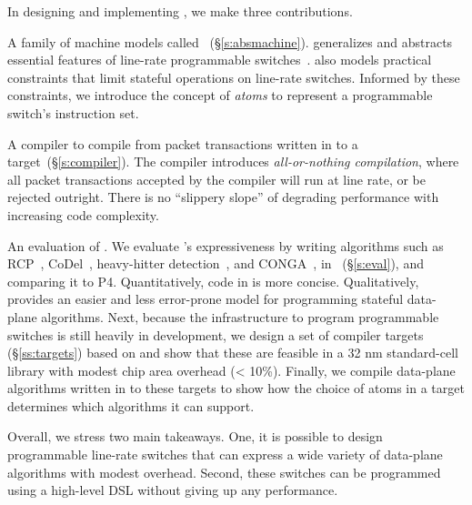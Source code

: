 In designing and implementing \pktlanguage, we make three contributions.
\begin{CompactEnumerate}
\item A family of machine models called \absmachine~(\S\ref{s:absmachine}).
    \absmachine generalizes and abstracts essential features of
line-rate programmable switches~\cite{rmt, xpliant, flexpipe}. \absmachine also
models practical constraints that limit stateful operations on line-rate
switches.  Informed by these constraints, we introduce the concept of {\em
atoms} to represent a programmable switch's instruction set.

\item A compiler to compile from packet transactions written in \pktlanguage
to a \absmachine target~(\S\ref{s:compiler}). The \pktlanguage compiler introduces
\textit{all-or-nothing compilation}, where all packet transactions accepted by
the compiler will run at line rate, or be rejected outright. There is no
``slippery slope'' of degrading performance with increasing code complexity.

\item An evaluation of \pktlanguage. We evaluate \pktlanguage's expressiveness
  by writing algorithms such as RCP~\cite{rcp}, CoDel~\cite{codel},
  heavy-hitter detection~\cite{opensketch}, and CONGA~\cite{conga}, in
  \pktlanguage~(\S\ref{s:eval}), and comparing it to P4.  Quantitatively, code
  in \pktlanguage is more concise. Qualitatively, \pktlanguage provides an
  easier and less error-prone model for programming stateful data-plane
  algorithms.  Next, because the infrastructure to program programmable
  switches is still heavily in development, we design a set of compiler targets
  (\S\ref{ss:targets}) based on \absmachine and show that these are feasible in
  a 32 nm standard-cell library with modest chip area overhead (< 10\%).
  Finally, we compile data-plane algorithms written in \pktlanguage to these
  targets to show how the choice of atoms in a target determines which
  algorithms it can support.
\end{CompactEnumerate}

Overall, we stress two main takeaways. One, it is possible to design
programmable line-rate switches that can express a wide variety of data-plane
algorithms with modest overhead. Second, these switches can be programmed using
a high-level DSL without giving up any performance.
